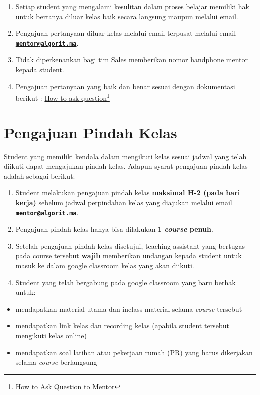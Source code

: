\documentclass[
]{book}
\providecommand{\tightlist}{%
  \setlength{\itemsep}{0pt}\setlength{\parskip}{0pt}}
\begin{document}
\begin{enumerate}
\def\labelenumi{\arabic{enumi}.}
\tightlist
\item
  Setiap student yang mengalami kesulitan dalam proses belajar memiliki hak untuk bertanya diluar kelas baik secara langsung maupun melalui email.
\item
  Pengajuan pertanyaan diluar kelas melalui email terpusat melalui email \textbf{\href{mailto:mentor@algorit.ma}{\nolinkurl{mentor@algorit.ma}}}.
\item
  Tidak diperkenankan bagi tim Sales memberikan nomor handphone mentor kepada student.
\item
  Pengajuan pertanyaan yang baik dan benar sesuai dengan dokumentasi berikut : \href{https://drive.google.com/file/d/1gWSTNF3wXK5Lbfssb-eT_A3gbnLvY_ez/view?usp=sharing}{How to ask question}\footnote{\href{https://drive.google.com/file/d/1gWSTNF3wXK5Lbfssb-eT_A3gbnLvY_ez/view?usp=sharing}{How to Ask Question to Mentor}}
\end{enumerate}

\hypertarget{pengajuan-pindah-kelas}{%
\section{Pengajuan Pindah Kelas}\label{pengajuan-pindah-kelas}}

Student yang memiliki kendala dalam mengikuti kelas sesuai jadwal yang telah diikuti dapat mengajukan pindah kelas. Adapun syarat pengajuan pindah kelas adalah sebagai berikut:

\begin{enumerate}
\def\labelenumi{\arabic{enumi}.}
\tightlist
\item
  Student melakukan pengajuan pindah kelas \textbf{maksimal H-2 (pada hari kerja)} sebelum jadwal perpindahan kelas yang diajukan melalui email \textbf{\href{mailto:mentor@algorit.ma}{\nolinkurl{mentor@algorit.ma}}}.
\item
  Pengajuan pindah kelas hanya bisa dilakukan \textbf{1 \emph{course} penuh}.
\item
  Setelah pengajuan pindah kelas disetujui, teaching assistant yang bertugas pada course tersebut \textbf{wajib} memberikan undangan kepada student untuk masuk ke dalam google classroom kelas yang akan diikuti.
\item
  Student yang telah bergabung pada google classroom yang baru berhak untuk:
\end{enumerate}

\begin{itemize}
\tightlist
\item
  mendapatkan material utama dan inclass material selama \emph{course} tersebut
\item
  mendapatkan link kelas dan recording kelas (apabila student tersebut mengikuti kelas online)
\item
  mendapatkan soal latihan atau pekerjaan rumah (PR) yang harus dikerjakan selama \emph{course} berlangsung
\end{itemize}
\end{document}

